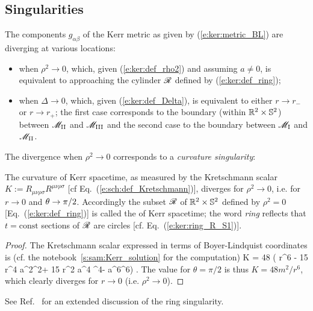 \subsection{Singularities} \label{s:ker:singularities}

The components $g_{\alpha\beta}$ of the Kerr metric as given by  (\ref{e:ker:metric_BL})
are diverging at various locations:
\begin{itemize}
\item when $\rho^2\rightarrow 0$, which, given (\ref{e:ker:def_rho2})
and assuming $a\not=0$, is equivalent to approaching
the cylinder $\mathscr{R}$ defined by (\ref{e:ker:def_ring});
\item when $\Delta\rightarrow 0$, which, given (\ref{e:ker:def_Delta}), is equivalent to either $r\rightarrow r_-$
or $r\rightarrow r_+$; the first case corresponds to the boundary (within $\mathbb{R}^2\times\mathbb{S}^2$)
between $\mathscr{M}_{\rm II}$ and $\mathscr{M}_{\rm III}$ and the second case to the boundary
between $\mathscr{M}_{\rm I}$ and $\mathscr{M}_{\rm II}$.
\end{itemize}

The divergence when $\rho^2\rightarrow 0$ corresponds to a
\emph{curvature singularity}:
\begin{prop}
The curvature of Kerr spacetime, as measured by the
Kretschmann scalar
$K := R_{\mu\nu\rho\sigma} R^{\mu\nu\rho\sigma}$
[cf Eq.~(\ref{e:sch:def_Kretschmann})], diverges for $\rho^2\rightarrow 0$,
i.e. for $r\to 0$ and $\theta \to \pi/2$. Accordingly the subset $\mathscr{R}$
of $\mathbb{R}^2\times\mathbb{S}^2$ defined by $\rho^2 =0$ [Eq.~(\ref{e:ker:def_ring})]
is called the
of Kerr spacetime; the word \emph{ring} reflects that $t=\mathrm{const}$
sections of $\mathscr{R}$ are circles [cf. Eq.~(\ref{e:ker:ring_R_S1})].
\end{prop}
\begin{proof}
The Kretschmann scalar expressed in terms of Boyer-Lindquist coordinates is (cf. the notebook~\ref{s:sam:Kerr_solution} for the computation)
\be \label{e:ker:Kretschmann}
    K = 48  \left( r^6 - 15 r^4 a^2\cos^2\th + 15 r^2 a^4 \cos^4\th - a^6\cos^6\th \right) .
\ee
The value for $\theta=\pi/2$ is thus $K = 48 m^2 / r^6$, which clearly diverges
for $r\rightarrow 0$ (i.e. $\rho^2\rightarrow 0$).
\end{proof}
See Ref.~\cite{ChrusMY20} for an extended discussion of the ring singularity.

